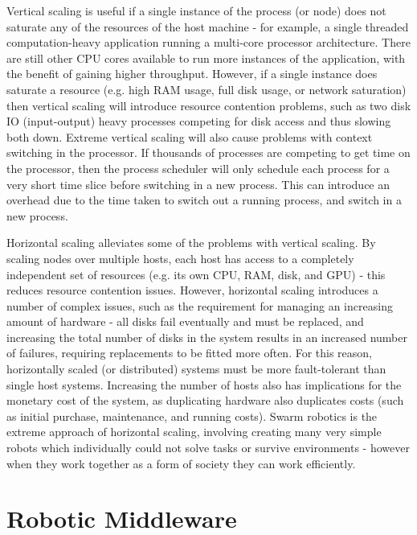 \documentclass[../dissertation.tex]{subfiles}
\begin{document}
Vertical scaling is useful if a single instance of the process (or node) does not saturate any of the resources of the host machine - for example, a single threaded computation-heavy application running a multi-core processor architecture. There are still other CPU cores available to run more instances of the application, with the benefit of gaining higher throughput. However, if a single instance does saturate a resource (e.g. high RAM usage, full disk usage, or network saturation) then vertical scaling will introduce resource contention problems, such as two disk IO (input-output) heavy processes competing for disk access and thus slowing both down. Extreme vertical scaling will also cause problems with context switching in the processor. If thousands of processes are competing to get time on the processor, then the process scheduler will only schedule each process for a very short time slice before switching in a new process. This can introduce an overhead due to the time taken to switch out a running process, and switch in a new process.

Horizontal scaling alleviates some of the problems with vertical scaling. By scaling nodes over multiple hosts, each host has access to a completely independent set of resources (e.g. its own CPU, RAM, disk, and GPU) - this reduces resource contention issues. However, horizontal scaling introduces a number of complex issues, such as the requirement for managing an increasing amount of hardware - all disks fail eventually and must be replaced, and increasing the total number of disks in the system results in an increased number of failures, requiring replacements to be fitted more often. For this reason, horizontally scaled (or distributed) systems must be more fault-tolerant than single host systems. Increasing the number of hosts also has implications for the monetary cost of the system, as duplicating hardware also duplicates costs (such as initial purchase, maintenance, and running costs). Swarm robotics is the extreme approach of horizontal scaling, involving creating many very simple robots which individually could not solve tasks or survive environments - however when they work together as a form of society they can work efficiently\cite{csahin2004swarm}.

\section{Robotic Middleware}
\label{robotic-middleware}
\end{document}
